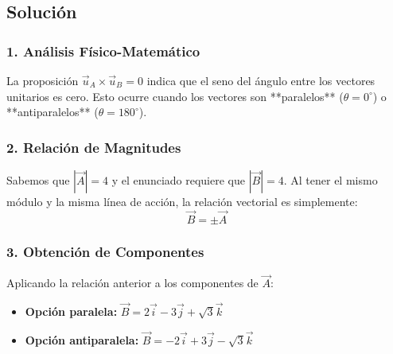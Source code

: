 \documentclass[12pt, a4paper]{article}
\begin{document}
\begin{center}
\end{center}

\subsection*{Solución}

\subsubsection*{1. Análisis Físico-Matemático}
La proposición $\vec{u}_A \times \vec{u}_B = 0$ indica que el seno del ángulo entre los vectores unitarios es cero. Esto ocurre cuando los vectores son **paralelos** ($\theta = 0^\circ$) o **antiparalelos** ($\theta = 180^\circ$).

\subsubsection*{2. Relación de Magnitudes}
Sabemos que $|\vec{A}| = 4$ y el enunciado requiere que $|\vec{B}| = 4$. Al tener el mismo módulo y la misma línea de acción, la relación vectorial es simplemente:
\begin{equation*}
    \vec{B} = \pm \vec{A}
\end{equation*}

\subsubsection*{3. Obtención de Componentes}
Aplicando la relación anterior a los componentes de $\vec{A}$:
\begin{itemize}
    \item \textbf{Opción paralela:} $\vec{B} = 2\vec{i} - 3\vec{j} + \sqrt{3}\vec{k}$
    \item \textbf{Opción antiparalela:} $\vec{B} = -2\vec{i} + 3\vec{j} - \sqrt{3}\vec{k}$
\end{itemize}
\end{document}
